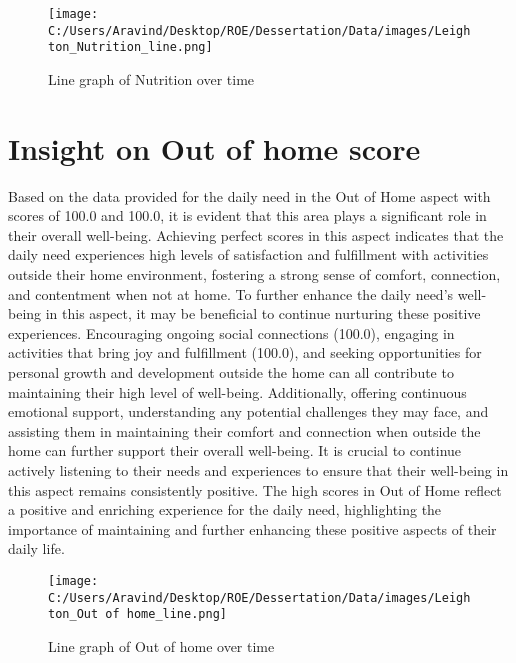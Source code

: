 \documentclass[10pt, a4paper]{article}%
\begin{document}
\begin{figure}[H]%
\centering%
\texttt{[image: C:/Users/Aravind/Desktop/ROE/Dessertation/Data/images/Leighton\_Nutrition\_line.png]}%
\caption{Line graph of Nutrition over time}%
\end{figure}

%
\section{Insight on Out of home score}%
\label{sec:InsightonOutofhomescore}%
Based on the data provided for the daily need in the Out of Home aspect with scores of 100.0 and 100.0, it is evident that this area plays a significant role in their overall well{-}being. Achieving perfect scores in this aspect indicates that the daily need experiences high levels of satisfaction and fulfillment with activities outside their home environment, fostering a strong sense of comfort, connection, and contentment when not at home.\newline%
\newline%
To further enhance the daily need's well{-}being in this aspect, it may be beneficial to continue nurturing these positive experiences. Encouraging ongoing social connections (100.0), engaging in activities that bring joy and fulfillment (100.0), and seeking opportunities for personal growth and development outside the home can all contribute to maintaining their high level of well{-}being.\newline%
\newline%
Additionally, offering continuous emotional support, understanding any potential challenges they may face, and assisting them in maintaining their comfort and connection when outside the home can further support their overall well{-}being. It is crucial to continue actively listening to their needs and experiences to ensure that their well{-}being in this aspect remains consistently positive.\newline%
\newline%
The high scores in Out of Home reflect a positive and enriching experience for the daily need, highlighting the importance of maintaining and further enhancing these positive aspects of their daily life.%


\begin{figure}[H]%
\centering%
\texttt{[image: C:/Users/Aravind/Desktop/ROE/Dessertation/Data/images/Leighton\_Out of home\_line.png]}%
\caption{Line graph of Out of home over time}%
\end{figure}
\end{document}
